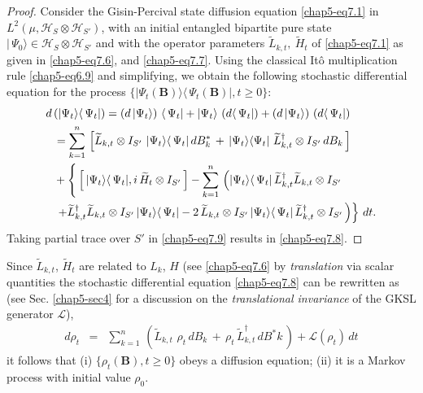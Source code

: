 \begin{proof}
Consider the Gisin-Percival state diffusion equation \eqref{chap5-eq7.1} in $L^2(\mu, \mathcal{H}_S\otimes\mathcal{H}_{S'})$, with an initial entangled bipartite pure state $\vert\,\Psi_0\rangle\in \mathcal{H}_S\otimes\mathcal{H}_{S'}$ and with the operator parameters  $\widetilde{L}_{k,t},\  \widetilde{H}_t$ of 
\eqref{chap5-eq7.1} as given in \eqref{chap5-eq7.6}, and \eqref{chap5-eq7.7}. Using the classical It{\^o} multiplication rule  \eqref{chap5-eq6.9} and simplifying, we obtain the following stochastic differential equation for the process $\{\vert\Psi_t(\mathbf{B})\rangle\langle\, \Psi_t(\mathbf{B})\vert, t\geq 0\}$:  
\begin{align}
		d\, & (\vert\Psi_t\rangle  \langle\, \Psi_t\vert)= \left( d\, \vert\Psi_t\rangle\right)\, \langle\,\Psi_t\vert+ \vert\Psi_t\rangle\, \left(d\langle\, \Psi_t\vert\right) + \left( d\, \vert\Psi_t\rangle\right)\,  \left(d\langle\, \Psi_t\vert\right) \notag\\
		&= \sum_{k=1}^{n}\,\left[\widetilde{L}_{k,t}\otimes I_{S'}\,\, \vert\Psi_t\rangle\langle\, \Psi_t\vert\, dB^*_{k}\, + \, \vert\Psi_t\rangle\langle \Psi_t\vert\,\,\widetilde{L}^\dag_{k,t}\otimes I_{S'}\,  dB_{k}\,\right]  \notag\\ 
		&+ \left\{\,  \left[\,\vert\Psi_t\rangle\langle\, \Psi_t\vert, i\, \widetilde{H}_{t}\otimes I_{S'}\, \right]  - \sum_{k=1}^{n}\, \left( \vert\Psi_t\rangle\langle\, \Psi_t\vert\, \widetilde{L}^\dag_{k,t} \widetilde{L}_{k,t}\otimes I_{S'} \right. \right. \notag\\ 
		&\left. \left. +\widetilde{L}^{\dag}_{k,t} \widetilde{L}_{k,t}\otimes I_{S'}\, \vert\Psi_t\rangle\langle\, \Psi_t\vert - 2\, \widetilde{L}_{k,t}\otimes I_{S'}\, \vert\Psi_t\rangle\langle\, \Psi_t\vert\, \widetilde{L}^\dag_{k,t}\otimes I_{S'}\,\right)\right\}\, dt. \label{chap5-eq7.9}
\end{align}
Taking partial trace  over $S'$ in \eqref{chap5-eq7.9} results in \eqref{chap5-eq7.8}.
\end{proof}

\begin{remark}
Since $\widetilde{L}_{k,t}$, $\widetilde{H}_t$ are related to $L_k$, $H$ (see \eqref{chap5-eq7.6} by {\em translation}  via scalar quantities the stochastic differential equation \eqref{chap5-eq7.8} can be rewritten as  (see Sec. \ref{chap5-sec4}  for a discussion on the {\em translational invariance} of the GKSL generator $\mathcal{L}$),
\begin{eqnarray}
d\rho_t &=& \sum_{k=1}^{n}\,\left( \widetilde{L}_{k,t}\,\, \rho_t\, dB_{k}\, + \, \rho_t\,\widetilde{L}^\dag_{k,t}\, dB^*{k}\,\right) + \mathcal{L}(\rho_t)\, dt \label{chap5-eq7.10}
\end{eqnarray}
it follows that (i) $\{\rho_t(\mathbf{B}),t\geq 0\}$  obeys a diffusion equation; (ii) it is a Markov process with initial value $\rho_0$. 
\end{remark}

